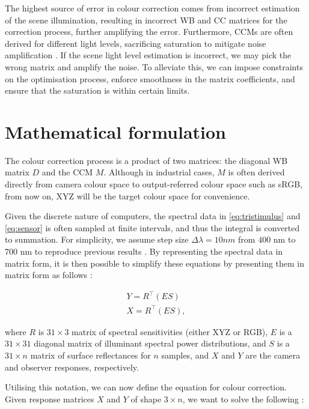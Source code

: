 The highest source of error in colour correction comes from incorrect estimation of the scene illumination, resulting in incorrect WB and CC matrices for the correction process, further amplifying the error. Furthermore, CCMs are often derived for different light levels, sacrificing saturation to mitigate noise amplification \cite{satvsnoise}. If the scene light level estimation is incorrect, we may pick the wrong matrix and amplify the noise. To alleviate this, we can impose constraints on the optimisation process, enforce smoothness in the matrix coefficients, and ensure that the saturation is within certain limits.

\section{Mathematical formulation}

The colour correction process is a product of two matrices: the diagonal WB matrix $D$ and the CCM $M$. Although in industrial cases, $M$ is often derived directly from camera colour space to output-referred colour space such as sRGB, from now on, XYZ will be the target colour space for convenience.

Given the discrete nature of computers, the spectral data in \ref{eq:tristimulus} 
and \ref{eq:sensor} is often sampled at finite intervals, and thus the integral is converted to summation. For simplicity, we assume step size $\Delta \lambda=10 nm$ from $400$ nm to $700$ nm to reproduce previous results \cite{finlayson2015color}. By representing the spectral data in matrix form, it is then possible to simplify these equations by presenting them in matrix form as follows \cite[37]{fang2021integrating}:

\begin{subequations}
\begin{align}
\label{eq:cmfsmatrix}
Y = R^{\top}(ES)\\
X = R^{\top}(ES),
\end{align}
\end{subequations}

where $R$ is $31 \times 3$ matrix of spectral sensitivities (either XYZ or RGB), $E$ is a $31 \times31$ diagonal matrix of illuminant spectral power distributions, and $S$ is a $31 \times n$ matrix of surface reflectances for $n$ samples, and $X$ and $Y$ are the camera and observer responses, respectively. 

Utilising this notation, we can now define the equation for colour correction. Given response matrices $X$ and $Y$ of shape $3 \times n$, we want to solve the following \cite[17]{rowlands2020color}:

